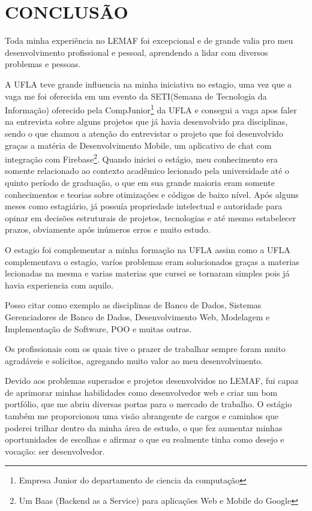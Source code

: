 \chapter{CONCLUSÃO}
\label{cap:conclusao}

Toda minha experiência no LEMAF foi excepcional e de grande valia pro meu desenvolvimento profissional e pessoal, aprendendo a lidar com diversos problemas e pessoas.

A UFLA teve grande influencia na minha iniciativa no estagio, uma vez que a vaga me foi oferecida em um evento da SETI(Semana de Tecnologia da Informação) oferecido pela CompJunior\footnote{Empresa Junior do departamento de ciencia da computação} da UFLA e consegui a vaga apos faler na entrevista sobre alguns projetos que já havia desenvolvido pra disciplinas,
 sendo o que chamou a atenção do entrevistar o projeto que foi desenvolvido graças a matéria de Desenvolvimento Mobile, um aplicativo de chat com integração com Firebase\footnote{Um Baas (Backend as a Service) para aplicações Web e Mobile do Google}.
Quando iniciei o estágio, meu conhecimento era somente relacionado ao contexto acadêmico lecionado pela universidade até o quinto período de graduação, o que em sua grande maioria eram somente conhecimentos e teorias sobre otimizações e códigos de baixo nível.
Após alguns meses como estagiário, já possuía propriedade intelectual e autoridade para opinar em decisões estruturais de projetos, tecnologias e até mesmo estabelecer prazos, obviamente após inúmeros erros e muito estudo.
 
O estagio foi complementar a minha formação na UFLA assim como a UFLA complementava o estagio, varíos problemas eram solucionados graças a materias lecionadas na mesma e varias materias que cursei se tornaram simples pois já havia experiencia com aquilo.

Posso citar como exemplo as disciplinas de Banco de Dados, Sistemas Gerenciadores de Banco de Dados, Desenvolvimento Web, Modelagem e Implementação de Software, POO e muitas outras.

Os profissionais com os quais tive o prazer de trabalhar sempre foram muito agradáveis e solícitos, agregando muito valor ao meu desenvolvimento.

Devido aos problemas superados e projetos desenvolvidos no LEMAF, fui capaz de aprimorar minhas habilidades como desenvolvedor web e criar um bom portfólio, que me abriu diversas portas para o mercado de trabalho.
O estágio também me proporcionou uma visão abrangente de cargos e caminhos que poderei trilhar dentro da minha área de estudo, o que fez aumentar minhas oportunidades de escolhas e afirmar o que eu realmente tinha como desejo e vocação: ser desenvolvedor.

